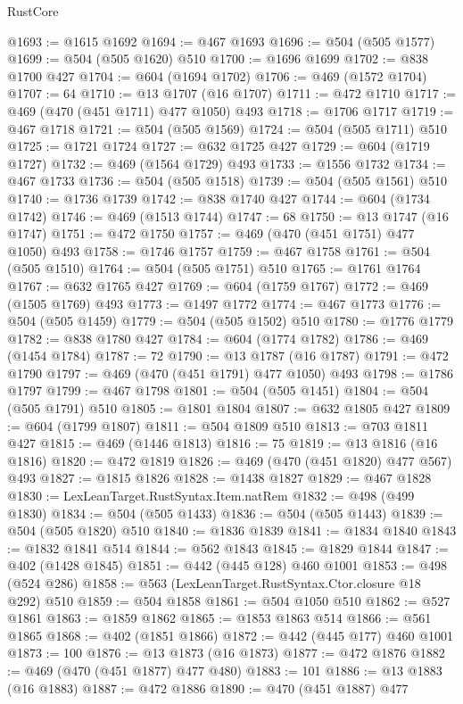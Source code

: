 \begin{lexlean}{RustCore}
\begin{coremodule}
@1693 := @1615 @1692
@1694 := @467 @1693
@1696 := @504 (@505 @1577)
@1699 := @504 (@505 @1620) @510
@1700 := @1696 @1699
@1702 := @838 @1700 @427
@1704 := @604 (@1694 @1702)
@1706 := @469 (@1572 @1704)
@1707 := 64
@1710 := @13 @1707 (@16 @1707)
@1711 := @472 @1710
@1717 := @469 (@470 (@451 @1711) @477 @1050) @493
@1718 := @1706 @1717
@1719 := @467 @1718
@1721 := @504 (@505 @1569)
@1724 := @504 (@505 @1711) @510
@1725 := @1721 @1724
@1727 := @632 @1725 @427
@1729 := @604 (@1719 @1727)
@1732 := @469 (@1564 @1729) @493
@1733 := @1556 @1732
@1734 := @467 @1733
@1736 := @504 (@505 @1518)
@1739 := @504 (@505 @1561) @510
@1740 := @1736 @1739
@1742 := @838 @1740 @427
@1744 := @604 (@1734 @1742)
@1746 := @469 (@1513 @1744)
@1747 := 68
@1750 := @13 @1747 (@16 @1747)
@1751 := @472 @1750
@1757 := @469 (@470 (@451 @1751) @477 @1050) @493
@1758 := @1746 @1757
@1759 := @467 @1758
@1761 := @504 (@505 @1510)
@1764 := @504 (@505 @1751) @510
@1765 := @1761 @1764
@1767 := @632 @1765 @427
@1769 := @604 (@1759 @1767)
@1772 := @469 (@1505 @1769) @493
@1773 := @1497 @1772
@1774 := @467 @1773
@1776 := @504 (@505 @1459)
@1779 := @504 (@505 @1502) @510
@1780 := @1776 @1779
@1782 := @838 @1780 @427
@1784 := @604 (@1774 @1782)
@1786 := @469 (@1454 @1784)
@1787 := 72
@1790 := @13 @1787 (@16 @1787)
@1791 := @472 @1790
@1797 := @469 (@470 (@451 @1791) @477 @1050) @493
@1798 := @1786 @1797
@1799 := @467 @1798
@1801 := @504 (@505 @1451)
@1804 := @504 (@505 @1791) @510
@1805 := @1801 @1804
@1807 := @632 @1805 @427
@1809 := @604 (@1799 @1807)
@1811 := @504 @1809 @510
@1813 := @703 @1811 @427
@1815 := @469 (@1446 @1813)
@1816 := 75
@1819 := @13 @1816 (@16 @1816)
@1820 := @472 @1819
@1826 := @469 (@470 (@451 @1820) @477 @567) @493
@1827 := @1815 @1826
@1828 := @1438 @1827
@1829 := @467 @1828
@1830 := LexLeanTarget.RustSyntax.Item.natRem
@1832 := @498 (@499 @1830)
@1834 := @504 (@505 @1433)
@1836 := @504 (@505 @1443)
@1839 := @504 (@505 @1820) @510
@1840 := @1836 @1839
@1841 := @1834 @1840
@1843 := @1832 @1841 @514
@1844 := @562 @1843
@1845 := @1829 @1844
@1847 := @402 (@1428 @1845)
@1851 := @442 (@445 @128) @460 @1001
@1853 := @498 (@524 @286)
@1858 := @563 (LexLeanTarget.RustSyntax.Ctor.closure @18 @292) @510
@1859 := @504 @1858
@1861 := @504 @1050 @510
@1862 := @527 @1861
@1863 := @1859 @1862
@1865 := @1853 @1863 @514
@1866 := @561 @1865
@1868 := @402 (@1851 @1866)
@1872 := @442 (@445 @177) @460 @1001
@1873 := 100
@1876 := @13 @1873 (@16 @1873)
@1877 := @472 @1876
@1882 := @469 (@470 (@451 @1877) @477 @480)
@1883 := 101
@1886 := @13 @1883 (@16 @1883)
@1887 := @472 @1886
@1890 := @470 (@451 @1887) @477

\end{coremodule}
\end{lexlean}
